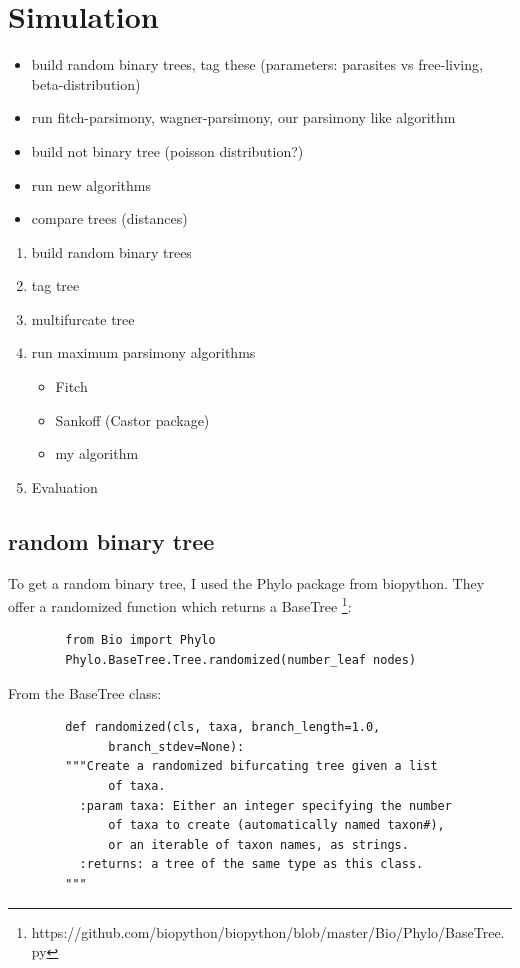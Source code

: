   \section{Simulation}
    \begin{itemize}
      \item build random binary trees, tag these (parameters: parasites vs free-living, 
        beta-distribution)
      \item run fitch-parsimony, wagner-parsimony, our parsimony like algorithm
      \item build not binary tree (poisson distribution?)
      \item run new algorithms
      \item compare trees (distances)
    \end{itemize}

    \begin{enumerate}
      \item build random binary trees
      \item tag tree
      \item multifurcate tree
      \item run maximum parsimony algorithms
      \begin{itemize}
        \item Fitch
        \item Sankoff (Castor package)
        \item my algorithm
      \end{itemize}
      \item Evaluation
    \end{enumerate}

    \subsection{random binary tree}
      To get a random binary tree, I used the Phylo package from biopython. They offer a randomized
        function which returns a BaseTree \footnote{
          https://github.com/biopython/biopython/blob/master/Bio/Phylo/BaseTree.py
        }:
      \begin{lstlisting}
        from Bio import Phylo
        Phylo.BaseTree.Tree.randomized(number_leaf nodes)
      \end{lstlisting}
      From the BaseTree class:
      \begin{lstlisting}
        def randomized(cls, taxa, branch_length=1.0, 
              branch_stdev=None):
        """Create a randomized bifurcating tree given a list
              of taxa.
          :param taxa: Either an integer specifying the number
              of taxa to create (automatically named taxon#), 
              or an iterable of taxon names, as strings.
          :returns: a tree of the same type as this class.
        """
      \end{lstlisting}

